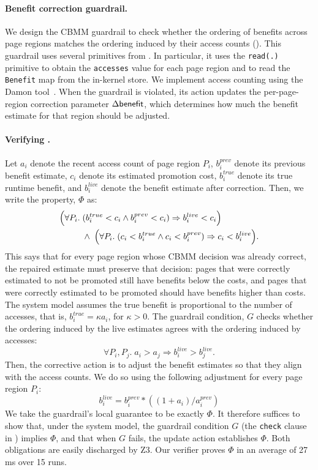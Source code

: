 \paragraph{Benefit correction guardrail.}
We design the CBMM guardrail to check whether the ordering of benefits across page regions matches the ordering induced by their access counts (). This guardrail uses several primitives from . In particular, it uses the {\tt read(.)} primitive to obtain the {\tt accesses} value for each page region and to read the {\tt Benefit} map from the in-kernel store. We implement access counting using the Damon tool~\cite{damon-middleware19}. When the guardrail is violated, its action updates the per-page-region correction parameter $\Delta{\sf benefit}$, which determines how much the benefit estimate for that region should be adjusted.

\paragraph{Verifying \perfsafety.}
Let $a_i$ denote the recent access count of page region $P_i$, $b_i^{prev}$ denote its previous benefit estimate, $c_i$ denote its estimated promotion cost, $b_i^{true}$ denote its true runtime benefit, and $b_i^{live}$ denote the benefit estimate after correction. Then, we write the \perfsafety property, $\Phi$ as:
\[
\begin{aligned}
\Bigl(\forall P_i.\;& (b_i^{true} < c_i \land b_i^{prev} < c_i)
\Rightarrow b_i^{live} < c_i \Bigr) \\
&\land\;
\Bigl(\forall P_i.\; (c_i < b_i^{true} \land c_i < b_i^{prev})
\Rightarrow c_i < b_i^{live} \Bigr).
\end{aligned}
\]
This says that for every page region whose CBMM decision was already correct, the repaired estimate must preserve that decision: pages that were correctly estimated to not be promoted still have benefits below the costs, and pages that were correctly estimated to be promoted should have benefits higher than costs.
The system model assumes the true benefit is proportional to the number of accesses, that is, \( b_i^{true} = \kappa a_i\), for $\kappa > 0$. The guardrail condition, $G$ checks whether the ordering induced by the live estimates agrees with the ordering induced by accesses:
\[
\forall P_i,P_j.\; a_i > a_j \Rightarrow b_i^{live} > b_j^{live}.
\]
Then, the corrective action is to adjust the benefit estimates so that they align with the access counts. We do so using the following adjustment for every page region $P_i$:
\[
b_i^{live} = b_i^{prev} * ((1 + a_i) / a_i^{prev})
\]
We take the guardrail's local guarantee to be exactly $\Phi$. It therefore suffices to show that, under the system model, the guardrail condition $G$ (the {\tt check} clause in ) implies $\Phi$, and that when $G$ fails, the update action establishes $\Phi$. Both obligations are easily discharged by Z3. Our verifier proves $\Phi$ in an average of 27\,ms over 15 runs.

